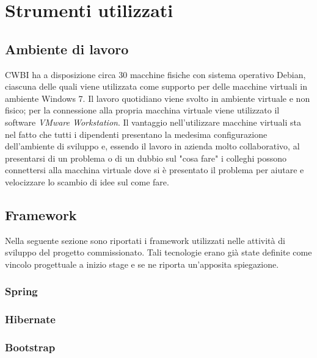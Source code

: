 \chapter{Strumenti utilizzati}
\label{cap:strumenti-utilizzati}


\setlength{\parskip}{3ex}

\section{Ambiente di lavoro}
CWBI ha a disposizione circa 30 macchine fisiche con sistema operativo Debian, ciascuna delle quali viene utilizzata come supporto per delle macchine virtuali in ambiente Windows 7. Il lavoro quotidiano viene svolto in ambiente virtuale e non fisico; per la connessione alla propria macchina virtuale viene utilizzato il software \textit{VMware Workstation}. Il vantaggio nell'utilizzare macchine virtuali sta nel fatto che tutti i dipendenti presentano la medesima configurazione dell'ambiente di sviluppo e, essendo il lavoro in azienda molto collaborativo, al presentarsi di un problema o di un dubbio sul "cosa fare" i colleghi possono connettersi alla macchina virtuale dove si è presentato il problema per aiutare e velocizzare lo scambio di idee sul come fare.

\section{Framework}
Nella seguente sezione sono riportati i framework utilizzati nelle attività di sviluppo del progetto commissionato. Tali tecnologie erano già state definite come vincolo progettuale a inizio stage e se ne riporta un'apposita spiegazione.

\subsection{Spring}


\subsection{Hibernate}


\subsection{Bootstrap}



